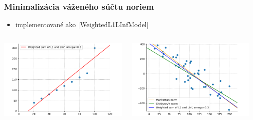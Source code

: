 \documentclass[presentation.tex]{subfiles}
\begin{document}
\begin{frame}
	\frametitle{Minimalizácia váženého súčtu noriem}
	\begin{itemize}
		\item implementované ako \pyth|WeightedL1LInfModel|
	\end{itemize}
	\begin{columns}
		\begin{column}{0.5\textwidth}
			\centering
			\includegraphics[width=0.8\linewidth]{../report/figs/weighted_linear_with_outlier_cropped.png}
		\end{column}
		\begin{column}{0.5\textwidth}
			\centering
			\includegraphics[width=0.8\linewidth]{../report/figs/all_three_random_cropped.png}
		\end{column}
	\end{columns}
	
\end{frame}
	
\end{document}
